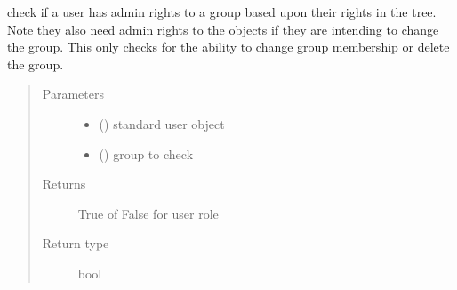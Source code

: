 \documentclass[letterpaper,10pt,english]{sphinxmanual}
\begin{document}
\begin{fulllineitems}
\label{\detokenize{rbac:rbac.core.rbac_user_is_group_admin}}
check if a user has admin rights to a group based upon their rights
in the tree. Note \sphinxhyphen{} they also need admin rights to the objects if they are
intending to change the group. This only checks for the ability to change
group membership or delete the group.
\begin{quote}\begin{description}
\item[{Parameters}] \leavevmode\begin{itemize}
\item {} 
 ({\hyperref[\detokenize{accounts:accounts.models.User}]{}}) \textendash{} standard user object

\item {} 
 ({\hyperref[\detokenize{rbac:rbac.models.RBACGroup}]{}}) \textendash{} group to check

\end{itemize}

\item[{Returns}] \leavevmode
True of False for user role

\item[{Return type}] \leavevmode
bool

\end{description}\end{quote}

\end{fulllineitems}

\end{document}
